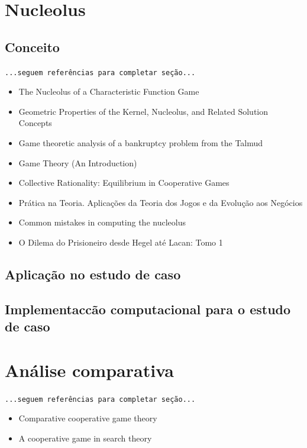\documentclass[
	article,			        %
	11pt,				          %
	oneside,			        %
	a4paper,			        %
	english,			        %
	brazil,				        %
	sumario=tradicional
]{abntex2}\usepackage[]{graphicx}\usepackage[]{color}
\begin{document}
\section{Nucleolus}

\subsection{Conceito}

  \texttt{\color{red}...seguem refer\^encias para completar seção...}
  \begin{itemize}
    \item The Nucleolus of a Characteristic Function Game \cite{Schmeidler.1969}
    \item Geometric Properties of the Kernel, Nucleolus, and Related Solution Concepts \cite{Maschler.1979}
    \item Game theoretic analysis of a bankruptcy problem from the Talmud \cite{Aumann.1985}
    \item Game Theory (An Introduction) \cite[p.~219--307]{Barron.2007}
    \item Collective Rationality: Equilibrium in Cooperative Games \cite{Weirich.2009}
    \item Prática na Teoria. Aplicações da Teoria dos Jogos e da Evolução aos Negócios \cite{Marinho.2011}
    \item Common mistakes in computing the nucleolus \cite{Guajardo.2015}
    \item O Dilema do Prisioneiro desde Hegel até Lacan: Tomo 1 \cite{Faveret.2015}
  \end{itemize}

\subsection{Aplica\c{c}\~ao no estudo de caso}

\subsection{Implementac{c}\~ao computacional para o estudo de caso}


\section{Análise comparativa}

  \texttt{\color{red}...seguem refer\^encias para completar seção...}
  \begin{itemize}
    \item Comparative cooperative game theory \cite{Ichiishi.1990}
    \item A cooperative game in search theory \cite{Hohzaki.2009}
  \end{itemize}
\end{document}
